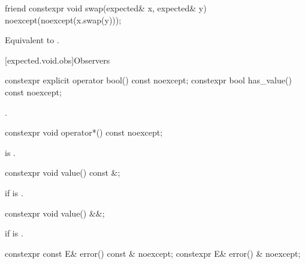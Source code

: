 %
\begin{itemdecl}
friend constexpr void swap(expected& x, expected& y) noexcept(noexcept(x.swap(y)));
\end{itemdecl}

\begin{itemdescr}
\pnum
\effects
Equivalent to .
\end{itemdescr}

[expected.void.obs]{Observers}

%
%
\begin{itemdecl}
constexpr explicit operator bool() const noexcept;
constexpr bool has_value() const noexcept;
\end{itemdecl}

\begin{itemdescr}
\pnum
\returns
{}.
\end{itemdescr}

%
\begin{itemdecl}
constexpr void operator*() const noexcept;
\end{itemdecl}

\begin{itemdescr}
\pnum
\expects
{} is .
\end{itemdescr}

%
\begin{itemdecl}
constexpr void value() const &;
\end{itemdecl}

\begin{itemdescr}
\pnum
\throws
{} if  is .
\end{itemdescr}

%
\begin{itemdecl}
constexpr void value() &&;
\end{itemdecl}

\begin{itemdescr}
\pnum
\throws
{}
if  is .
\end{itemdescr}

%
\begin{itemdecl}
constexpr const E& error() const & noexcept;
constexpr E& error() & noexcept;
\end{itemdecl}

